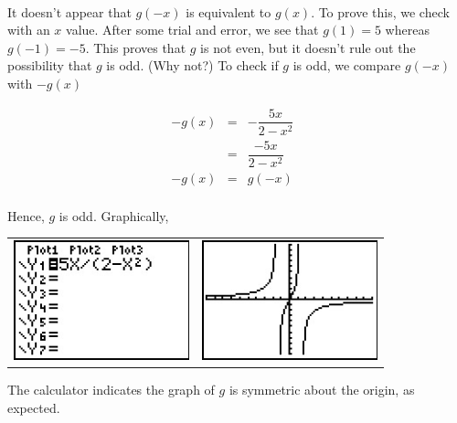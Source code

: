 \begin{ex}
\begin{enumerate}
\[\begin{array}{rclr}
\end{array} \]

It doesn't appear that $g(-x)$ is equivalent to $g(x)$.  To prove this, we check with an $x$ value.  After some trial and error, we see that $g(1) = 5$ whereas $g(-1) = -5$.  This proves that $g$ is not even, but it doesn't rule out the possibility that $g$ is odd. (Why not?)  To check if $g$ is odd, we compare $g(-x)$ with $-g(x)$


 \[ \begin{array}{rclr}   

- g(x) & = & - \dfrac{5x}{2 - x^2} & \\ 
& = &  \dfrac{-5x}{2 - x^2} & \\  
-g(x) & = & g(-x) & \\  

\end{array} \]

\setlength{\extrarowheight}{2pt}

Hence, $g$ is odd.  Graphically,

\begin{center}

\begin{tabular}{cc}

\includegraphics[width=2in]{./RelationsandFunctionsGraphics/GraphsofFunctions03.jpg} \hspace{.75in} & \includegraphics[width=2in]{./RelationsandFunctionsGraphics/GraphsofFunctions04.jpg} \\

\end{tabular}

\end{center}

The calculator indicates the graph of $g$ is symmetric about the origin, as expected.


\end{enumerate}
\end{ex}
